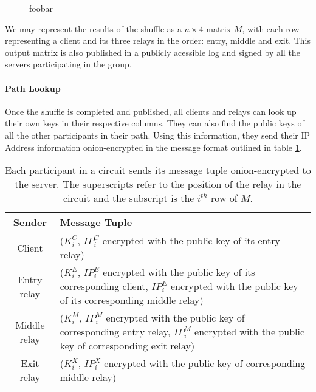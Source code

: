 \begin{figure}[htb]
\centering
\hspace{\fill}%
\hspace{\fill}%
\hspace*{\fill}%
\caption[bla]{foobar}
\end{figure}

We may represent the results of the shuffle as a $n \times 4$ matrix $M$, with
each row representing a client and its three relays in the order: entry, middle
and exit. This output matrix is also published in a publicly acessible log and
signed by all the servers participating in the group.

\paragraph{Path Lookup}
Once the shuffle is completed and published, all clients and relays can look up
their own keys in their respective columns. They can also find the public keys 
of all the other participants in their path. Using this information, they send 
their IP Address information onion-encrypted in the message format outlined in
table \ref{table:message_format}.

\begin{table}
  \begin{tabular}{ c || p{9cm} }
  \hline
  Sender & Message Tuple \\ \hline
  Client & ($K_{i}^{C}$, {$IP_{i}^{C}$ encrypted with the public key of its 
  entry relay}) \\ \hline
  Entry relay & ($K_{i}^{E}$, {$IP_{i}^{E}$ encrypted with the public key of 
  its corresponding client}, {$IP_{i}^{E}$ encrypted with the public key of 
  its corresponding middle relay}) \\ \hline
  Middle relay & ($K_{i}^{M}$, {$IP_{i}^{M}$ encrypted with the public key of 
  corresponding entry relay}, {$IP_{i}^{M}$ encrypted with the public key of 
  corresponding exit relay}) \\ \hline
  Exit relay & ($K_{i}^{X}$, {$IP_{i}^{X}$ encrypted with the public key of 
  corresponding middle relay}) \\ \hline
  \end{tabular}
  \caption{Each participant in a circuit sends its message 
  tuple onion-encrypted to the server. The superscripts refer to the position 
  of the relay in the circuit and the subscript is the $i^{th}$ row of $M$.}
  \label{table:message_format}
\end{table}

